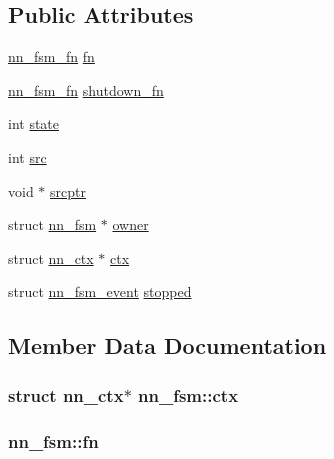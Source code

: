 \subsection*{Public Attributes}
\begin{DoxyCompactItemize}
\item 
\hyperlink{fsm_8h_a05d92fd756f8b8d8ced977e68cace00b}{nn\+\_\+fsm\+\_\+fn} \hyperlink{structnn__fsm_a1fc34a657fdc5cc744c7ea51df7d38a4}{fn}
\item 
\hyperlink{fsm_8h_a05d92fd756f8b8d8ced977e68cace00b}{nn\+\_\+fsm\+\_\+fn} \hyperlink{structnn__fsm_a3ee3d9dd131d8761661e2e5ba2bba998}{shutdown\+\_\+fn}
\item 
int \hyperlink{structnn__fsm_a91bac7a0fffbb658bcbfa8610716d497}{state}
\item 
int \hyperlink{structnn__fsm_a71a938d92be27604a5db6228937736c8}{src}
\item 
void $\ast$ \hyperlink{structnn__fsm_a2f1dfafc0afec5d79c7944e7b2235b1f}{srcptr}
\item 
struct \hyperlink{structnn__fsm}{nn\+\_\+fsm} $\ast$ \hyperlink{structnn__fsm_ae9d3ae6031c4acec6fccac4e50bf9451}{owner}
\item 
struct \hyperlink{structnn__ctx}{nn\+\_\+ctx} $\ast$ \hyperlink{structnn__fsm_a1a6e8f761e19091bfb7846acdaf577b5}{ctx}
\item 
struct \hyperlink{structnn__fsm__event}{nn\+\_\+fsm\+\_\+event} \hyperlink{structnn__fsm_aba53a9882b534f46315292f7a879c018}{stopped}
\end{DoxyCompactItemize}


\subsection{Member Data Documentation}
\subsubsection[{ctx}]{\setlength{\rightskip}{0pt plus 5cm}struct {\bf nn\+\_\+ctx}$\ast$ nn\+\_\+fsm\+::ctx}\hypertarget{structnn__fsm_a1a6e8f761e19091bfb7846acdaf577b5}{}\label{structnn__fsm_a1a6e8f761e19091bfb7846acdaf577b5}
\subsubsection[{fn}]{ nn\+\_\+fsm\+::fn}\hypertarget{structnn__fsm_a1fc34a657fdc5cc744c7ea51df7d38a4}{}\label{structnn__fsm_a1fc34a657fdc5cc744c7ea51df7d38a4}
